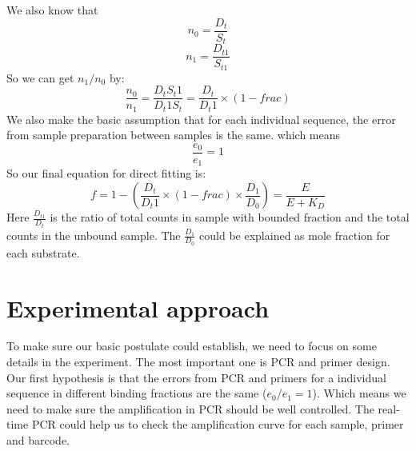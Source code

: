 \documentclass[a4paper, 10pt]{article}
\begin{document}
We also know that 
\[
n_0 = \frac{D_t}{S_t}
\]
\[n_1 =\frac{D_{t1}}{S_{t1}}
\]
So we can get $n_1/n_0$ by:
\[
\frac{n_0}{n_1} = \frac{D_{t}S_t1}{D_t1S_{t}} = \frac{D_{t}}{D_t1}\times (1-frac)
\]
We also make the basic assumption that for each individual sequence, the error from sample preparation between samples is the same. which means
$$
\frac{e_0}{e_1} = 1 
$$
So our final equation for direct fitting is:
\[
f = 1 -( \frac{D_{t}}{D_t1}\times (1-frac) \times \frac{D_1}{D_0})= \frac{E}{E+K_D}
\]
Here $ \frac{D_{t1}}{D_t}$ is the ratio of total counts in sample with bounded fraction and the total counts in the unbound sample. The $\frac{D_1}{D_0}$ could be explained as mole fraction for each substrate.

\section{Experimental approach}
To make sure our basic postulate could establish, we need to focus on some details in the experiment. The most important one is PCR and primer design.
Our first hypothesis is that the errors from PCR and primers for a individual sequence in different binding fractions are the same ($e_0/e_1 = 1$). Which means we need to make sure the amplification in PCR should be well controlled. The real-time PCR could help us to check the amplification curve for each sample, primer and barcode. 
\end{document}
